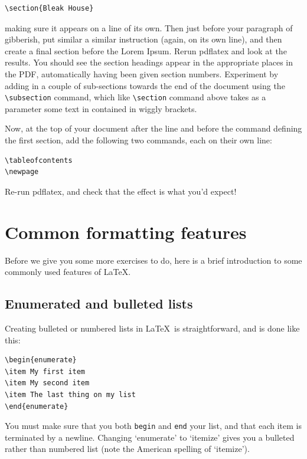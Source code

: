 \begin{refsection}
\begin{verbatim}
\section{Bleak House}
\end{verbatim}
%
making sure it appears on a line of its own. Then just before your paragraph of gibberish, put similar a similar instruction (again, on its own line), and then create a final section before the Lorem Ipsum. Rerun pdflatex and look at the results. You should see the section headings appear in the appropriate places in the PDF, automatically having been given section numbers. Experiment by adding in a couple of sub-sections towards the end of the document using the  \verb|\subsection| command, which like \verb|\section| command above takes as a parameter some text in contained in wiggly brackets. 

Now, at the top of your document after the \verb|| line and before the command defining the first section, add the following two commands, each on their own line:

\begin{verbatim}
\tableofcontents
\newpage
\end{verbatim}
%
Re-run pdflatex, and check that the effect is what you'd expect!

\section{Common formatting features}

Before we give you some more exercises to do, here is a brief introduction to some commonly used features of \LaTeX.

\subsection{Enumerated and bulleted lists}

Creating bulleted or numbered lists in \LaTeX\ is straightforward, and is done like this:

\begin{verbatim}
\begin{enumerate}
\item My first item
\item My second item
\item The last thing on my list
\end{enumerate}
\end{verbatim}
%
You must make sure that you both \texttt{begin} and \texttt{end} your list, and that each item is terminated by a newline. Changing `enumerate' to `itemize' gives you a bulleted rather than numbered list (note the American spelling of `itemize').  


\end{refsection}
